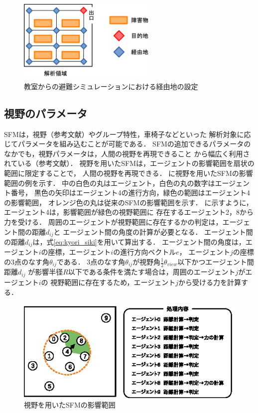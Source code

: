 \begin{figure}[t]
 \begin{center}
  \includegraphics[height=4cm,clip]{figure/keiyuti_ex2.eps}
  \caption{教室からの避難シミュレーションにおける経由地の設定}
  \label{fig:jitumondai_ex}
 \end{center}
\end{figure}

\subsection{視野のパラメータ}
SFMは，視野（参考文献）やグループ特性，車椅子などといった
解析対象に応じてパラメータを組み込むことが可能である．
SFMの追加できるパラメータのなかでも，視野パラメータは，人間の視野を再現できること
から幅広く利用されている（参考文献）．
視野を用いたSFMは，エージェントの影響範囲を扇状の範囲に限定することで，
人間の視野を再現できる．
に視野を用いたSFMの影響範囲の例を示す．
中の白色の丸はエージェント，白色の丸の数字はエージェント番号，
黒色の矢印はエージェント4の進行方向，緑色の範囲はエージェント4の影響範囲，
オレンジ色の丸は従来のSFMの影響範囲を示す．
に示すように，エージェント4は，影響範囲が緑色の視野範囲に
存在するエージェント2，8から力を受ける．
周囲のエージェントが視野範囲に存在するかの判定は，エージェント間の距離$d_{ij}$と
エージェント間の角度の計算が必要となる．
エージェント間の距離$d_{ij}$は，式\eqref{eq:kyori_siki}を用いて算出する．
エージェント間の角度は，エージェント$i$の座標，エージェント$i$の進行方向ベクトル$e$，
エージェント$j$の座標の3点のなす角$\theta_{ij}$である．
3点のなす角$\theta_{ij}$が視野角$\frac{1}{2}\theta_{view}$以下かつエージェント間距離$d_{ij}$
が影響半径$R$以下である条件を満たす場合は，周囲のエージェント$j$がエージェント$i$の
視野範囲に存在するため，エージェント$j$から受ける力を計算する．


\begin{figure}[h]
 \begin{center}
  \includegraphics[width=11.5cm,clip]{figure/eikyo_hankei_siya.eps}
  \caption{視野を用いたSFMの影響範囲}
  \label{fig:siya_hani}
 \end{center}
\end{figure}

